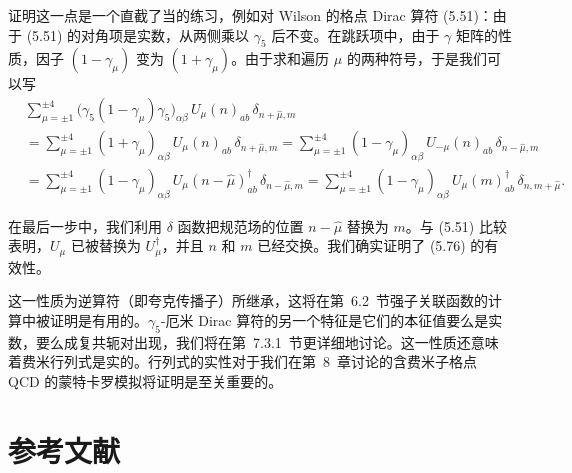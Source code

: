 证明这一点是一个直截了当的练习，例如对 Wilson 的格点 Dirac 算符 (5.51)：由于 (5.51) 的对角项是实数，从两侧乘以 $\gamma_5$ 后不变。在跳跃项中，由于 $\gamma$ 矩阵的性质，因子 $(1-\gamma_\mu)$ 变为 $(1+\gamma_\mu)$。由于求和遍历 $\mu$ 的两种符号，于是我们可以写
\begin{equation}
  \begin{aligned}
    &\sum_{\mu=\pm1}^{\pm4}\big(\gamma_5(1-\gamma_\mu)\gamma_5\big)_{\alpha\beta}\,
      U_\mu(n)_{ab}\,\delta_{n+\hat{\mu},m}\\
    &= \sum_{\mu=\pm1}^{\pm4}(1+\gamma_\mu)_{\alpha\beta}\,
      U_\mu(n)_{ab}\,\delta_{n+\hat{\mu},m}
     = \sum_{\mu=\pm1}^{\pm4}(1-\gamma_\mu)_{\alpha\beta}\,
      U_{-\mu}(n)_{ab}\,\delta_{n-\hat{\mu},m}\\
    &= \sum_{\mu=\pm1}^{\pm4}(1-\gamma_\mu)_{\alpha\beta}\,
      U_\mu(n-\hat{\mu})^\dagger_{ab}\,\delta_{n-\hat{\mu},m}
     = \sum_{\mu=\pm1}^{\pm4}(1-\gamma_\mu)_{\alpha\beta}\,
      U_\mu(m)^\dagger_{ab}\,\delta_{n,m+\hat{\mu}} .
  \end{aligned}
\end{equation}

在最后一步中，我们利用 $\delta$ 函数把规范场的位置 $n-\hat{\mu}$ 替换为 $m$。与 (5.51) 比较表明，$U_\mu$ 已被替换为 $U_\mu^\dagger$，并且 $n$ 和 $m$ 已经交换。我们确实证明了 (5.76) 的有效性。

这一性质为逆算符（即夸克传播子）所继承，这将在第~6.2~节强子关联函数的计算中被证明是有用的。$\gamma_5$-厄米 Dirac 算符的另一个特征是它们的本征值要么是实数，要么成复共轭对出现，我们将在第~7.3.1~节更详细地讨论。这一性质还意味着费米行列式是实的。行列式的实性对于我们在第~8~章讨论的含费米子格点 QCD 的蒙特卡罗模拟将证明是至关重要的。

\section*{参考文献}


